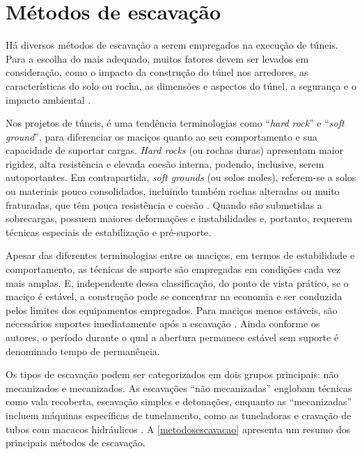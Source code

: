 \section{Métodos de escavação}

Há diversos métodos de escavação a serem empregados na execução de túneis. Para a escolha do mais adequado, muitos fatores devem ser levados em consideração, como o impacto da construção do túnel nos arredores, as características do solo ou rocha, as dimensões e aspectos do túnel, a segurança e o impacto ambiental \cite{Moreira2006}. 

Nos projetos de túneis, é uma tendência terminologias como ``\textit{hard rock}'' e ``\textit{soft ground}'', para diferenciar os maciços quanto ao seu comportamento e sua capacidade de suportar cargas. \textit{Hard rocks} (ou rochas duras) apresentam maior rigidez, alta resistência e elevada coesão interna, podendo, inclusive, serem autoportantes. Em contrapartida, \textit{soft grounds} (ou solos moles), referem-se a solos ou materiais pouco consolidados, incluindo também rochas alteradas ou muito fraturadas, que têm pouca resistência e coesão \cite{Chapman2018}. Quando são submetidas a sobrecargas, possuem maiores deformações e instabilidades e, portanto, requerem técnicas especiais de estabilização e pré-suporte.

Apesar das diferentes terminologias entre os maciços, em termos de estabilidade e comportamento, as técnicas de suporte são empregadas em condições cada vez mais amplas. E, independente dessa classificação, do ponto de vista prático, se o maciço é estável, a construção pode se concentrar na economia e ser conduzida pelos limites dos equipamentos empregados. Para maciços menos estáveis, são necessários suportes imediatamente após a escavação \cite{Chapman2018}. Ainda conforme os autores, o período durante o qual a abertura permanece estável sem suporte é denominado tempo de permanência.


Os tipos de escavação podem ser categorizados em dois grupos principais: não mecanizados e mecanizados. As escavações ``não mecanizadas'' englobam técnicas como vala recoberta, escavação simples e detonações, enquanto as ``mecanizadas'' incluem máquinas específicas de tunelamento, como as tuneladoras e cravação de tubos com macacos hidráulicos \cite{Quevedo2017}. A \autoref{metodosescavacao} apresenta um resumo dos principais métodos de escavação.

